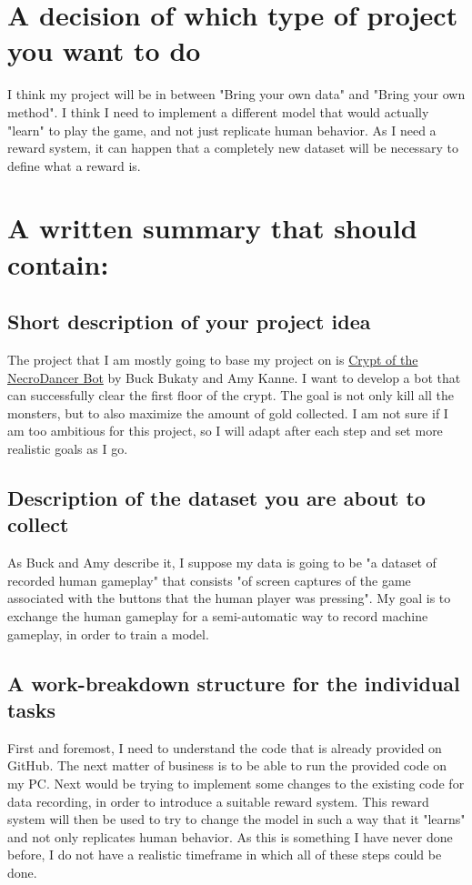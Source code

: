\documentclass{article}
\begin{document}
\section{A decision of which type of project you want to do}
I think my project will be in between "Bring your own data" and "Bring your own method". I think I need to implement a different model that would actually "learn" to play the game, and not just replicate human behavior. As I need a reward system, it can happen that a completely new dataset will be necessary to define what a reward is.
\section{A written summary that should contain:}
\subsection{Short description of your project idea}
 The project that I am mostly going to base my project on is \href{https://bbukaty.github.io/CoNBot/}{Crypt of the NecroDancer Bot} by Buck Bukaty and Amy Kanne. I want to develop a bot that can successfully clear the first floor of the crypt. The goal is not only kill all the monsters, but to also maximize the amount of gold collected. I am not sure if I am too ambitious for this project, so I will adapt after each step and set more realistic goals as I go.
\subsection{Description of the dataset you are about to collect}
As Buck and Amy describe it, I suppose my data is going to be "a dataset of recorded human gameplay" that consists "of screen captures of the game associated with the buttons that the human player was pressing"\cite{CotNDBot}. My goal is to exchange the human gameplay for a semi-automatic way to record machine gameplay, in order to train a model.
\subsection{A work-breakdown structure for the individual tasks}
First and foremost, I need to understand the code that is already provided on GitHub. The next matter of business is to be able to run the provided code on my PC. Next would be trying to implement some changes to the existing code for data recording, in order to introduce a suitable reward system. This reward system will then be used to try to change the model in such a way that it "learns" and not only replicates human behavior. As this is something I have never done before, I do not have a realistic timeframe in which all of these steps could be done.



\end{document}
